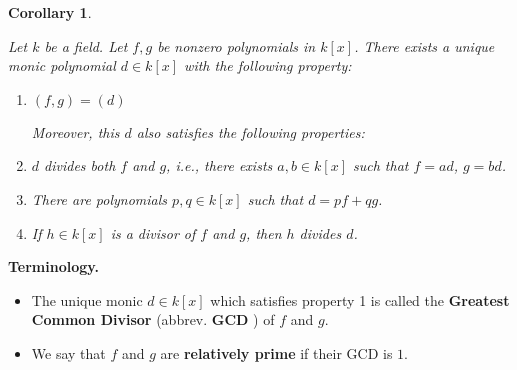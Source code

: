 \documentclass[a4paper,12pt]{report}
\newcounter{statement}
\numberwithin{statement}{chapter}
\newtheorem{cor}[statement]{Corollary}
\numberwithin{equation}{chapter}
\numberwithin{section}{chapter}
\numberwithin{subsection}{section}
\begin{document}
\begin{cor}
\label{bezoutsforpolynomials}


Let $k$ be a field.  Let $f, g$ be nonzero polynomials in $k[x]$.  There exists a unique monic polynomial
$d \in k[x]$ with the following property:
\begin{enumerate}
\item 
$(f, g) = (d)$



Moreover, this $d$ also satisfies the following properties:

\item 

$d$ divides both $f$ and $g$, i.e., there exists $a, b \in k[x]$ such that $f = ad$, $g = bd$.


\item 

There are polynomials $p, q \in k[x]$ such that $d = pf + qg$.


\item 

If $h \in k[x]$ is a divisor of $f$ and $g$, then $h$ divides $d$.

\end{enumerate}
\end{cor}



 {\bf Terminology.} 

\begin{itemize}
\item 
The unique monic $d \in k[x]$ which satisfies property 1
is called the  {\bf Greatest Common Divisor}  (abbrev.  {\bf GCD} ) of $f$ and $g$.

\item 
We say that $f$ and $g$ are  {\bf relatively prime}  if their GCD is $1$.
\end{itemize}
\end{document}
